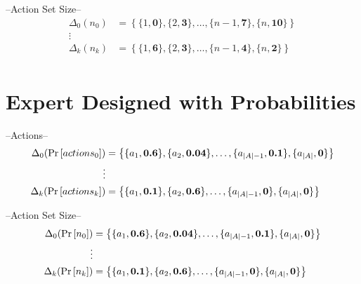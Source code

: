 \documentclass[11pt]{article}
\begin{document}
\noindent --Action Set Size--
\begin{align*}
\Delta_0(n_0) &= \left\{\{1,\boldsymbol{0}\},\{2,\boldsymbol{3}\}, \ldots, \{n-1, \boldsymbol{7}\}, \{n,\boldsymbol{10}\} \right\} \\
\vdots \\
\Delta_k(n_k) &= \left\{\{1,\boldsymbol{6}\},\{2,\boldsymbol{3}\}, \ldots, \{n-1, \boldsymbol{4}\}, \{n,\boldsymbol{2}\} \right\} \\
\end{align*}

\section{Expert Designed with Probabilities}
\noindent --Actions--
\begin{align*}
\Delta_0(\text{Pr} \left[ actions_0 \right]) &= \left\{\{a_1,\boldsymbol{0.6}\},\{a_2,\boldsymbol{0.04}\}, \ldots, \{a_{|A| - 1},\boldsymbol{0.1}\}, \{a_{|A|},\boldsymbol{0}\} \right\} \\
\vdots \\
\Delta_k(\text{Pr} \left[ actions_k \right]) &= \left\{\{a_1,\boldsymbol{0.1}\},\{a_2,\boldsymbol{0.6}\}, \ldots, \{a_{|A| - 1},\boldsymbol{0}\}, \{a_{|A|},\boldsymbol{0}\} \right\} \\
\end{align*}

\noindent --Action Set Size--
\begin{align*}
\Delta_0(\text{Pr} \left[ n_0 \right]) &= \left\{\{a_1,\boldsymbol{0.6}\},\{a_2,\boldsymbol{0.04}\}, \ldots, \{a_{|A| - 1},\boldsymbol{0.1}\}, \{a_{|A|},\boldsymbol{0}\} \right\} \\
\vdots \\
\Delta_k(\text{Pr} \left[ n_k \right]) &= \left\{\{a_1,\boldsymbol{0.1}\},\{a_2,\boldsymbol{0.6}\}, \ldots, \{a_{|A| - 1},\boldsymbol{0}\}, \{a_{|A|},\boldsymbol{0}\} \right\} \\
\end{align*}

\citet{tellex11}

{\small

  
}
\end{document}
